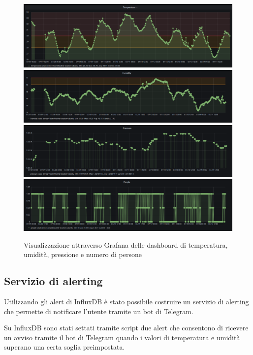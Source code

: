 \documentclass{article}
\begin{document}
\begin{figure}
    \centering
    {{\includegraphics[width=13cm]{img/grafanaTemp.png}}}%
    \bigskip
    \qquad
    {{\includegraphics[width=13cm]{img/grafanaHumidity.png}}}%
    \bigskip
    \qquad
    {{\includegraphics[width=13cm]{img/grafanaPressure.png}}}%
    \bigskip
    \qquad
    {{\includegraphics[width=13cm]{img/grafanaPeople.png}}}%
    \caption{Visualizzazione attraverso Grafana delle dashboard di temperatura, umidità, pressione e numero di persone}
    \label{fig:grafana}
\end{figure}


\subsection{Servizio di alerting}
Utilizzando gli alert di InfluxDB è stato possibile costruire un servizio di alerting che permette di notificare l'utente tramite un bot di Telegram. 

Su InfluxDB sono stati settati tramite script due alert che consentono di ricevere un avviso tramite il bot di Telegram quando i valori di temperatura e umidità superano una certa soglia preimpostata.
\end{document}
